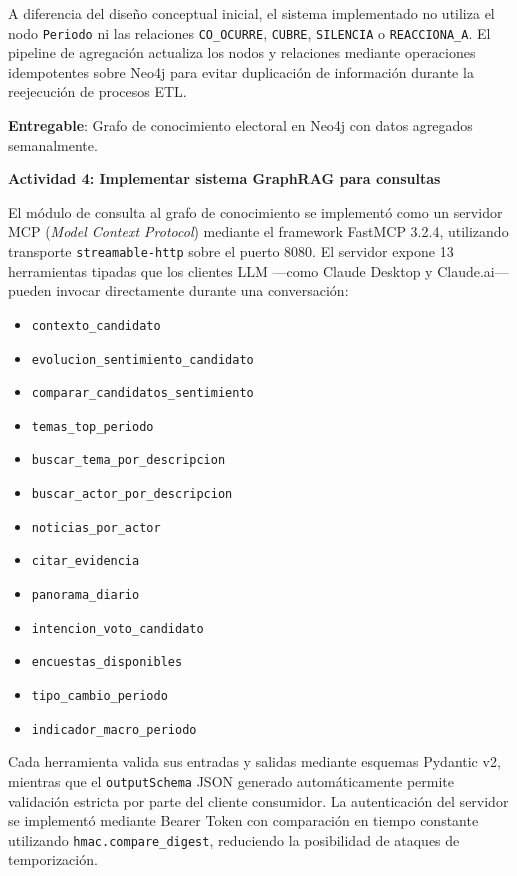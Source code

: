 \documentclass[listof=nochaptergap,12pt,times,authoryear]{report}
\begin{document}
A diferencia del diseño conceptual inicial, el sistema implementado no utiliza el nodo \texttt{Periodo} ni las relaciones \texttt{CO\_OCURRE}, \texttt{CUBRE}, \texttt{SILENCIA} o \texttt{REACCIONA\_A}. El pipeline de agregación actualiza los nodos y relaciones mediante operaciones idempotentes sobre Neo4j para evitar duplicación de información durante la reejecución de procesos ETL.
 
\textbf{Entregable}: Grafo de conocimiento electoral en Neo4j con datos agregados semanalmente.
 
\textbf{Actividad 4: Implementar sistema GraphRAG para consultas}
 
El módulo de consulta al grafo de conocimiento se implementó como un servidor MCP (\textit{Model Context Protocol}) mediante el framework FastMCP 3.2.4, utilizando transporte \texttt{streamable-http} sobre el puerto 8080. El servidor expone 13 herramientas tipadas que los clientes LLM —como Claude Desktop y Claude.ai— pueden invocar directamente durante una conversación:

\begin{itemize}
    \item \texttt{contexto\_candidato}
    \item \texttt{evolucion\_sentimiento\_candidato}
    \item \texttt{comparar\_candidatos\_sentimiento}
    \item \texttt{temas\_top\_periodo}
    \item \texttt{buscar\_tema\_por\_descripcion}
    \item \texttt{buscar\_actor\_por\_descripcion}
    \item \texttt{noticias\_por\_actor}
    \item \texttt{citar\_evidencia}
    \item \texttt{panorama\_diario}
    \item \texttt{intencion\_voto\_candidato}
    \item \texttt{encuestas\_disponibles}
    \item \texttt{tipo\_cambio\_periodo}
    \item \texttt{indicador\_macro\_periodo}
\end{itemize}

Cada herramienta valida sus entradas y salidas mediante esquemas Pydantic v2, mientras que el \texttt{outputSchema} JSON generado automáticamente permite validación estricta por parte del cliente consumidor. La autenticación del servidor se implementó mediante Bearer Token con comparación en tiempo constante utilizando \texttt{hmac.compare\_digest}, reduciendo la posibilidad de ataques de temporización.
 
\end{document}
